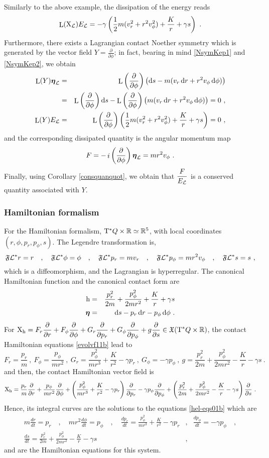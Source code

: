 \documentclass[12pt]{report}
\def\bea{\begin{eqnarray}}
\def\eea{\end{eqnarray}}
\def\beann{\begin{eqnarray*}}
\def\eeann{\end{eqnarray*}}
\def\dst{\displaystyle}
\def\derpar#1#2{\frac{\partial{#1}}{\partial{#2}}}
\def\vf{\mathfrak X}
\def\Lag{{\cal L}}
\def\d{{\rm d}}
\def\Real{\mathbb{R}}
\def\bmeta{\mbox{\boldmath $\eta$}}
\def\X{{\rm X}}
\def\Tan{{\rm T}}
\def\Lie{\mathop{\rm L}\nolimits}
\def\inn{\mathop{i}\nolimits}
\begin{document}
Similarly to the above example,
the dissipation of the energy reads
$$
\Lie(\X_\Lag)E_\Lag=-\gamma \left(\frac{1}{2}m(v_r^2+r^2v_\phi^2)+\frac{K}{r}+\gamma s\right)\ .
$$
Furthermore, there exists a Lagrangian contact Noether symmetry 
which is generated by the vector field $\dst Y=\derpar{}{\phi}$; in fact,
bearing in mind \eqref{NsymKep1} and \eqref{NsymKep2}, we obtain
\beann
\Lie(Y)\bmeta_\Lag&=& 
\Lie\left(\derpar{}{\phi}\right)\left(\d s-m(v_r\,\d r+r^2v_\phi\,\d\phi)\right) \\ &=&
\Lie\left(\derpar{}{\phi}\right)\d s-
\Lie\left(\derpar{}{\phi}\right)\left(m(v_r\,\d r+r^2v_\phi\,\d\phi)\right)=0 \ , 
\\
\Lie(Y)E_\Lag&=& 
\Lie\left(\derpar{}{\phi}\right)\left(\frac{1}{2}m(v_r^2+r^2v_\phi^2)+\frac{K}{r}+\gamma s\right)=0 \ ,
\eeann
and the corresponding dissipated quantity is the
angular momentum map
$$
F=-\inn\left(\derpar{}{\phi}\right)\bmeta_\Lag=mr^2v_\phi \ .
$$
Finally, using Corollary \ref{consquanquot},
we obtain that $\dst\frac{F}{E_\Lag}$ is a conserved quantity associated with $Y$.

\subsubsection{Hamiltonian formalism}

For the Hamiltonian formalism, $\Tan^*Q\times\Real\simeq\Real^5$,
with local coordinates $(r,\phi,p_r,p_\phi,s)$. The Legendre transformation is,
$$
\mathfrak{F}\Lag^*r=r  \quad , \quad \mathfrak{F}\Lag^*\phi=\phi \quad , \quad
\mathfrak{F}\Lag^*p_r=mv_r  \quad , \quad \mathfrak{F}\Lag^*p_\phi=mr^2v_\phi \quad , \quad \mathfrak{F}\Lag^*s=s  \ ,
$$
which is a diffeomorphism, and the Lagrangian is hyperregular.
The canonical Hamiltonian function and the canonical contact form are
\beann
{\rm h}&=&\frac{p_r^2}{2m}+\frac{p_\phi^2}{2mr^2}+\frac{K}{r}+\gamma s \\
\bmeta&=&\d s-p_r\,\d r-p_\phi\,\d\phi \ .
\eeann
For $\displaystyle \X_{\rm h}=F_r\derpar{}{r}+F_\phi\derpar{}{\phi}+
G_r\derpar{}{p_r}+G_\phi\derpar{}{p_\phi}+g\derpar{}{s}\in\vf(\Tan^*Q\times\Real)$,
the contact Hamiltonian equations \eqref{evolvf11b} lead to
$$
F_r=\frac{p_r}{m} \ , \ F_\phi=\frac{p_\phi}{mr^2} \ , \
G_r=\frac{p_\phi^2}{mr^3}+\frac{K}{r^2}-\gamma p_r \ , \ G_\phi=-\gamma p_\phi  \ , \ g=\frac{p_r^2}{2m}+\frac{p_\phi^2}{2mr^2}-\frac{K}{r}-\gamma s \ .
$$
and then, the contact Hamiltonian vector field is
$$
\X_{\rm h}=\frac{p_r}{m}\derpar{}{r}+\frac{p_\phi}{mr^2}\derpar{}{\phi}+\left(\frac{p_\phi^2}{mr^3}+\frac{K}{r^2}-\gamma p_r\right)\derpar{}{p_r}-\gamma p_\phi\derpar{}{p_\phi}+\left(\frac{p_r^2}{2m}+\frac{p_\phi^2}{2mr^2}-\frac{K}{r}-\gamma s\right)\derpar{}{s} \ .
$$
Hence, its integral curves are the solutions to the equations \eqref{hel-eqs01b} which are
\bea
m\frac{dr}{dt} =p_r \quad , \quad mr^2\frac{d\phi}{dt} =p_\phi \quad , \quad
\frac{dp_r}{dt}=\frac{p_\phi^2}{mr^3}+\frac{K}{r^2}-\gamma p_r & , &
\frac{dp_\phi}{dt}=-\gamma p_\phi \quad ,
\label{dislawKeppler} \\
\frac{ds}{dt}=\frac{p_r^2}{2m}+\frac{p_\phi^2}{2mr^2}-\frac{K}{r}-\gamma s & , & \nonumber
\eea
and are the Hamiltonian equations for this system.
\end{document}
